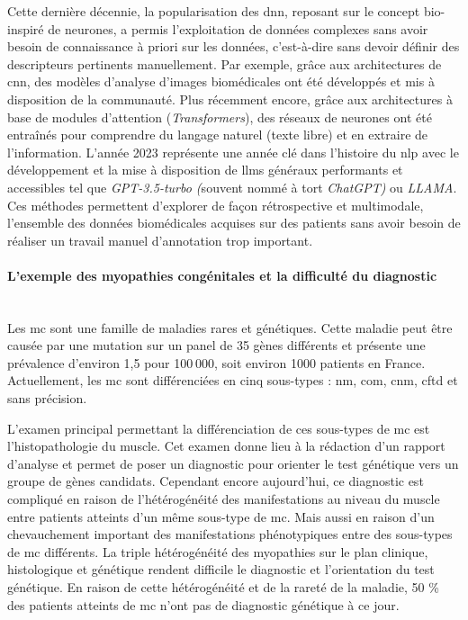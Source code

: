 Cette dernière décennie, la popularisation des \gls{dnn}, reposant sur le concept bio-inspiré de neurones, a permis l’exploitation de données complexes sans avoir besoin de connaissance à priori sur les données, c’est-à-dire sans devoir définir des descripteurs pertinents manuellement. Par exemple, grâce aux architectures de \gls{cnn}, des modèles d’analyse d’images biomédicales ont été développés et mis à disposition de la communauté. Plus récemment encore, grâce aux architectures à base de modules d’attention (\textit{Transformers}), des réseaux de neurones ont été entraînés pour comprendre du langage naturel (texte libre) et en extraire de l’information. L’année 2023 représente une année clé dans l’histoire du \gls{nlp} avec le développement et la mise à disposition de \gls{llms} généraux performants et accessibles tel que \textit{GPT-3.5-turbo (}souvent nommé à tort \textit{ChatGPT)} ou \textit{LLAMA}. Ces méthodes permettent d’explorer de façon rétrospective et multimodale, l’ensemble des données biomédicales acquises sur des patients sans avoir besoin de réaliser un travail manuel d’annotation trop important.

\paragraph{\textbf{L’exemple des myopathies congénitales et la difficulté du diagnostic}}\mbox{}\\

Les \gls{mc} sont une famille de maladies rares et génétiques. Cette maladie peut être causée par une mutation sur un panel de 35 gènes différents et présente une prévalence d’environ 1,5 pour 100 000, soit environ 1000 patients en France. Actuellement, les \gls{mc} sont différenciées en cinq sous-types : \gls{nm}, \gls{com}, \gls{cnm}, \gls{cftd} et sans précision.

L’examen principal permettant la différenciation de ces sous-types de \gls{mc} est l’histopathologie du muscle. Cet examen donne lieu à la rédaction d’un rapport d’analyse et permet de poser un diagnostic pour orienter le test génétique vers un groupe de gènes candidats. Cependant encore aujourd’hui, ce diagnostic est compliqué en raison de l’hétérogénéité des manifestations au niveau du muscle entre patients atteints d’un même sous-type de \gls{mc}. Mais aussi en raison d’un chevauchement important des manifestations phénotypiques entre des sous-types de \gls{mc} différents. La triple hétérogénéité des myopathies sur le plan clinique, histologique et génétique rendent difficile le diagnostic et l’orientation du test génétique. En raison de cette hétérogénéité et de la rareté de la maladie, 50 \% des patients atteints de \gls{mc} n’ont pas de diagnostic génétique à ce jour. 

